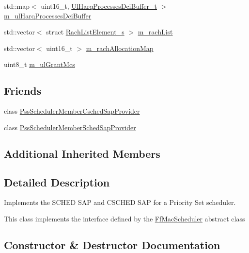 \begin{DoxyCompactItemize}
std\+::map$<$ uint16\+\_\+t, \hyperlink{namespacens3_a042cbd6bf67e73911cba35b8c070223d}{Ul\+Harq\+Processes\+Dci\+Buffer\+\_\+t} $>$ \hyperlink{classns3_1_1PssFfMacScheduler_adfb2ba26a401807d40208e7b8f01f813}{m\+\_\+ul\+Harq\+Processes\+Dci\+Buffer}
\item 
std\+::vector$<$ struct \hyperlink{structns3_1_1RachListElement__s}{Rach\+List\+Element\+\_\+s} $>$ \hyperlink{classns3_1_1PssFfMacScheduler_a7365478ecd213eef5da163ace10a94ed}{m\+\_\+rach\+List}
\item 
std\+::vector$<$ uint16\+\_\+t $>$ \hyperlink{classns3_1_1PssFfMacScheduler_af093989004d46e1bf45ba2bdb1dfa03e}{m\+\_\+rach\+Allocation\+Map}
\item 
uint8\+\_\+t \hyperlink{classns3_1_1PssFfMacScheduler_a535c4d18454b96af02427b81a3b20930}{m\+\_\+ul\+Grant\+Mcs}
\end{DoxyCompactItemize}
\subsection*{Friends}
\begin{DoxyCompactItemize}
\item 
class \hyperlink{classns3_1_1PssFfMacScheduler_a142f1cdc3a9a0831d8cc0beb9ee55924}{Pss\+Scheduler\+Member\+Csched\+Sap\+Provider}
\item 
class \hyperlink{classns3_1_1PssFfMacScheduler_aaa7b9ef44118729ff0c95dfe22fdb7de}{Pss\+Scheduler\+Member\+Sched\+Sap\+Provider}
\end{DoxyCompactItemize}
\subsection*{Additional Inherited Members}


\subsection{Detailed Description}
Implements the S\+C\+H\+ED S\+AP and C\+S\+C\+H\+ED S\+AP for a Priority Set scheduler. 

This class implements the interface defined by the \hyperlink{classns3_1_1FfMacScheduler}{Ff\+Mac\+Scheduler} abstract class 

\subsection{Constructor \& Destructor Documentation}
